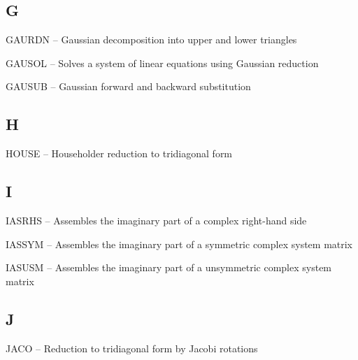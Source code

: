 \subsection*{G} %
\begin{list}{}{\leftmargin=80pt  \itemsep=0pt}
\item[GAURDN \hfill] -- Gaussian decomposition into upper and lower triangles
\item[GAUSOL \hfill] -- Solves a system of linear equations using Gaussian reduction
\item[GAUSUB \hfill] -- Gaussian forward and backward substitution
\end{list}
\subsection*{H} %
\begin{list}{}{\leftmargin=80pt  \itemsep=0pt}
\item[HOUSE \hfill]  -- Householder reduction to tridiagonal form
\end{list}
\subsection*{I} %
\begin{list}{}{\leftmargin=80pt  \itemsep=0pt}
\item[IASRHS \hfill] -- Assembles the imaginary part of a complex right-hand side
\item[IASSYM \hfill] -- Assembles the imaginary part of a symmetric complex system matrix
\item[IASUSM \hfill] -- Assembles the imaginary part of a unsymmetric complex system matrix
\end{list}
\subsection*{J} %
\begin{list}{}{\leftmargin=80pt  \itemsep=0pt}
\item[JACO \hfill]   -- Reduction to tridiagonal form by Jacobi rotations
\end{list}
